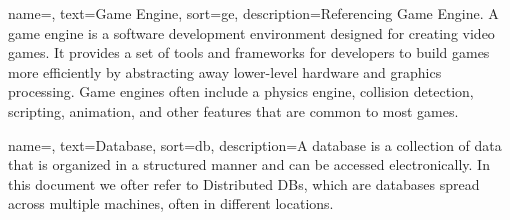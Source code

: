
\renewcommand{\acronymname}{Acronyms and abbreviations}




{
    name=,
    text=Game Engine,
    sort=ge,
    description={Referencing Game Engine. A game engine is a software development environment designed for creating video games. It provides a set of tools and frameworks for developers to build games more efficiently by abstracting away lower-level hardware and graphics processing. Game engines often include a physics engine, collision detection, scripting, animation, and other features that are common to most games.}
}

{
    name=,
    text=Database,
    sort=db,
    description={A database is a collection of data that is organized in a structured manner and can be accessed electronically. In this document we ofter refer to Distributed DBs, which are databases spread across multiple machines, often in different locations.}
}

